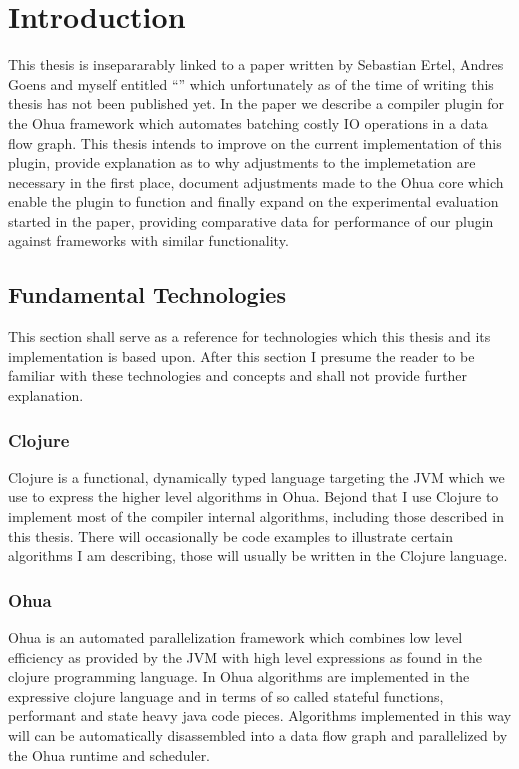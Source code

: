 
\chapter{Introduction} %

\label{ChapterIntro} %


This thesis is insepararably linked to a paper written by Sebastian Ertel, Andres Goens and myself entitled ``\yauhauPaperTitle{}'' which unfortunately as of the time of writing this thesis has not been published yet.
In the paper we describe a compiler plugin for the Ohua framework which automates batching costly IO operations in a data flow graph.
This thesis intends to improve on the current implementation of this plugin, provide explanation as to why adjustments to the implemetation are necessary in the first place, document adjustments made to the Ohua core which enable the plugin to function and finally expand on the experimental evaluation started in the paper, providing comparative data for performance of our plugin against frameworks with similar functionality.

\section{Fundamental Technologies}

This section shall serve as a reference for technologies which this thesis and its implementation is based upon.
After this section I presume the reader to be familiar with these technologies and concepts and shall not provide further explanation.

\subsection{Clojure}

Clojure is a functional, dynamically typed language targeting the JVM  which we use to express the higher level algorithms in Ohua.
Bejond that I use Clojure to implement most of the compiler internal algorithms, including those described in this thesis.
There will occasionally be code examples to illustrate certain algorithms I am describing, those will usually be written in the Clojure language.

\subsection{Ohua}

Ohua is an automated parallelization framework which combines low level efficiency as provided by the JVM with high level expressions as found in the clojure programming language.
In Ohua algorithms are implemented in the expressive clojure language and in terms of so called stateful functions, performant and state heavy java code pieces.
Algorithms implemented in this way will can be automatically disassembled into a data flow graph and parallelized by the Ohua runtime and scheduler.
